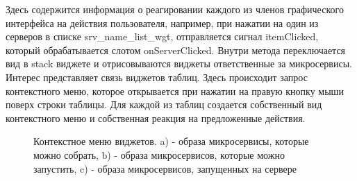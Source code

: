\documentclass[a4paper, 14pt]{extreport}
\begin{document}
\par Здесь содержится информация о реагировании каждого из членов графического интерфейса на действия пользователя, например, при 
нажатии на один из серверов в списке srv\_name\_list\_wgt, отправляется сигнал itemClicked, который обрабатывается слотом 
onServerClicked. Внутри метода переключается вид в stack виджете и отрисовываются виджеты ответственные за микросервисы. Интерес 
представляет связь виджетов таблиц. Здесь происходит запрос контекстного меню, которое открывается при нажатии на правую кнопку мыши 
поверх строки таблицы. Для каждой из таблиц создается собственный вид контекстного меню и собственная реакция на предложенные действия.
\begin{figure}[h]
\begin{minipage}[h]{0.49\linewidth}
\end{minipage}
\hfill
\begin{minipage}[h]{0.49\linewidth}
\end{minipage}
\hfill
\begin{minipage}[h]{\linewidth}
\end{minipage}
\caption{Контекстное меню виджетов. a) - образа микросервисы, которые можно собрать, b) - образа микросервисов, которые можно запустить, c) - образа микросервисов, запущенных на сервере}
\label{ris:image1}
\end{figure}
\end{document}
